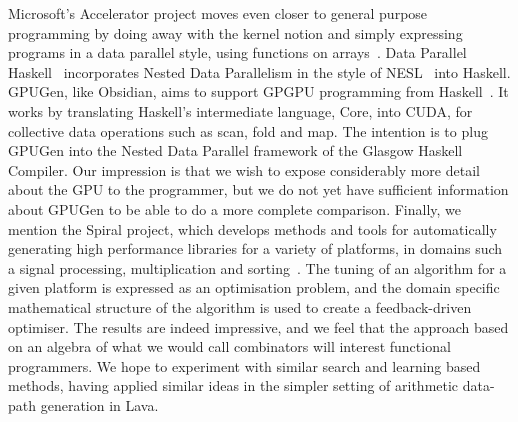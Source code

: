 Microsoft's Accelerator project moves even closer to general purpose programming by doing away with the kernel notion and simply expressing programs in a data parallel style, using functions on arrays~.
Data Parallel Haskell~ incorporates Nested Data Parallelism in the style of NESL~ into Haskell. GPUGen, like Obsidian, aims
to support GPGPU programming from Haskell~. It works by translating Haskell's intermediate language, Core, into CUDA, for collective data operations such as scan, fold and map. The intention is to plug GPUGen into the Nested Data Parallel framework of the Glasgow Haskell Compiler. Our impression is that we wish to expose considerably more detail about the GPU to the programmer, but we do not yet have sufficient information about GPUGen to be able to do a more complete comparison. Finally, we mention the Spiral project, which develops methods and tools for automatically generating high performance libraries for a variety of platforms, in domains such a signal processing, multiplication and sorting~.
The tuning of an algorithm for a given platform is expressed as an optimisation problem, and the domain specific mathematical structure of the algorithm is used
to create a feedback-driven optimiser. The results are indeed impressive, and we feel that the approach based on an algebra of what we would call combinators
will interest functional programmers. We hope to experiment with similar
search and learning based methods, having applied similar ideas in the simpler setting of arithmetic data-path generation in Lava.

